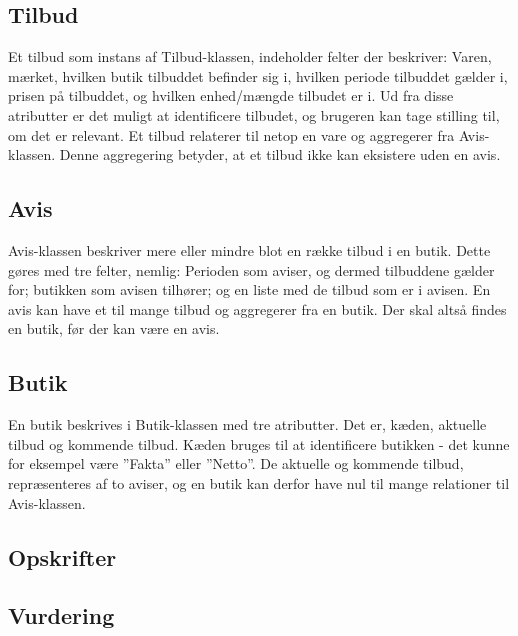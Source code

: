\subsection{Tilbud}
Et tilbud som instans af Tilbud-klassen, indeholder felter der beskriver: Varen, mærket, hvilken butik tilbuddet befinder sig i, hvilken periode tilbuddet gælder i, prisen på tilbuddet, og hvilken enhed/mængde tilbudet er i. 
Ud fra disse atributter er det muligt at identificere tilbudet, og brugeren kan tage stilling til, om det er relevant. 
Et tilbud relaterer til netop en vare og aggregerer fra Avis-klassen. 
Denne aggregering betyder, at et tilbud ikke kan eksistere uden en avis.

\subsection{Avis}
Avis-klassen beskriver mere eller mindre blot en række tilbud i en butik. 
Dette gøres med tre felter, nemlig: Perioden som aviser, og dermed tilbuddene gælder for; butikken som avisen tilhører; og en liste med de tilbud som er i avisen. 
En avis kan have et til mange tilbud og aggregerer fra en butik.
Der skal altså findes en butik, før der kan være en avis.

\subsection{Butik}
En butik beskrives i Butik-klassen med tre atributter.
Det er, kæden, aktuelle tilbud og kommende tilbud. Kæden bruges til at identificere butikken - det kunne for eksempel være ''Fakta'' eller ''Netto''.
De aktuelle og kommende tilbud, repræsenteres af to aviser, og en butik kan derfor have nul til mange relationer til Avis-klassen.

\subsection{Opskrifter}
\lipsum[1]

\subsection{Vurdering}
\lipsum[1]
